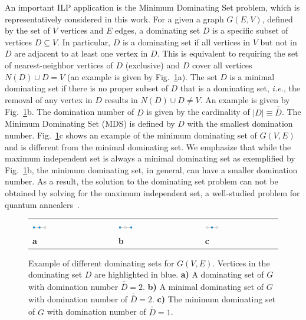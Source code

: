 \documentclass[prd,twocolumn,tightenlines,preprintnumbers,showpacs,superscriptaddress,notitlepage,nofootinbib,eqsecnum,floatfix,longbibliography,aps,10pt]{revtex4-2}
\begin{document}
An important ILP application is the Minimum Dominating Set problem, which is representatively considered in this work.
For a given a graph $G(E,V)$, defined by the set of $V$ vertices and $E$ edges, a dominating set $D$ is a specific subset of vertices $D \subseteq V$.
In particular, $D$ is a dominating set if all vertices in $V$ but not in $D$ are adjacent to at least one vertex in $D$.
This is equivalent to requiring the set of nearest-neighbor vertices of $D$ (exclusive) and $D$ cover all vertices $N(D) \cup D = V$ (an example is given by Fig.~\ref{fig:dominating_sets}a).
The set $D$ is a minimal dominating set if there is no proper subset of $D$ that is a dominating set, {\it{i.e.}}, the removal of any vertex in $D$ results in $N(D) \cup D  \neq V$.
An example is given by Fig.~\ref{fig:dominating_sets}b.
The domination number of $D$ is given by the cardinality of $|D| \equiv \overline{\overline{D}}$.
The Minimum Dominating Set (MDS) is defined by $D$ with the smallest domination number.
Fig.~\ref{fig:dominating_sets}c shows an example of the minimum dominating set of $G(V, E)$ and is different from the minimal dominating set.
We emphasize that while the maximum independent set is always a minimal dominating set as exemplified by Fig.~\ref{fig:dominating_sets}b, the minimum dominating set, in general, can have a smaller domination number.
As a result, the solution to the dominating set problem can not be obtained by solving for the maximum independent set, a well-studied problem for quantum annealers~\cite{}.

\begin{figure}
	\centering
	\begin{tabular}{p{}p{}p{}p{}p{}}
	\includegraphics[width=0.2\textwidth]{./new_figures/MDS_mds0.pdf}
&&
	\includegraphics[width=0.2\textwidth]{./new_figures/MDS_mds1.pdf}
&&
	\includegraphics[width=0.2\textwidth]{./new_figures/MDS_mds2.pdf}\\
	\centering\textbf{a} && \centering\textbf{b} && \centering\textbf{c}
	\end{tabular}
	\caption{Example of different dominating sets for $G(V, E)$. Vertices in the dominating set $D$ are highlighted in blue. {\textbf{a)}} A dominating set of $G$ with domination number $\overline{\overline{D}} = 2$. {\textbf{b)}} A minimal dominating set of $G$ with domination number of $\overline{\overline{D}} = 2$. {\textbf{c)}} The minimum dominating set of $G$ with domination number of $\overline{\overline{D}} = 1$.}
	\label{fig:dominating_sets}
\end{figure}
\end{document}
